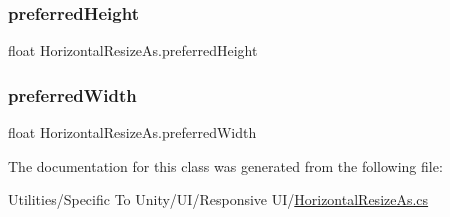 \subsubsection{\texorpdfstring{preferred\+Height}{preferredHeight}}
{\footnotesize\ttfamily float Horizontal\+Resize\+As.\+preferred\+Height\hspace{0.3cm}{\ttfamily [get]}}

\mbox{\label{class_horizontal_resize_as_aadc4d17f4c258ca1b16de61bd27b33c4}} 
\subsubsection{\texorpdfstring{preferred\+Width}{preferredWidth}}
{\footnotesize\ttfamily float Horizontal\+Resize\+As.\+preferred\+Width\hspace{0.3cm}{\ttfamily [get]}}



The documentation for this class was generated from the following file\+:\begin{DoxyCompactItemize}
\item 
Utilities/\+Specific To Unity/\+U\+I/\+Responsive U\+I/\hyperlink{_horizontal_resize_as_8cs}{Horizontal\+Resize\+As.\+cs}\end{DoxyCompactItemize}
